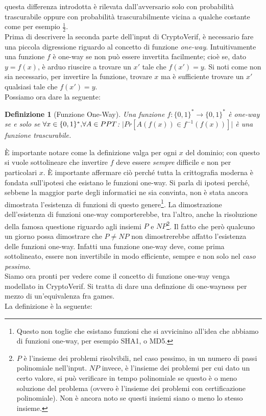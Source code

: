 \documentclass[a4paper,openright,twoside,12pt]{report}
\newtheorem{definizione}{Definizione}[chapter]
\begin{document}
questa differenza introdotta \`e rilevata dall'avversario solo con probabilit\`a trascurabile oppure con probabilit\`a trascurabilmente vicina a qualche costante come 
per esempio $\frac{1}{2}$.
\\ 
Prima di descrivere la seconda parte dell'input di CryptoVerif, \`e necessario fare una piccola digressione riguardo al concetto di funzione \emph{one-way}.
Intuitivamente una funzione $f$ \`e one-way se non pu\`o essere invertita facilmente; cio\`e se, dato $y=f(x)$, \`e arduo riuscire a trovare un $x'$ tale che $f(x')=y$. 
Si noti come non sia necessario, per invertire la funzione, trovare $x$ ma \`e sufficiente trovare un $x'$ qualsiasi tale che $f(x')=y$.
\\Possiamo ora dare la seguente:
\begin{definizione}[Funzione One-Way]
Una funzione $f: \{0,1\}^*\rightarrow \{0,1\}^*$ \`e one-way se e solo se $\forall x \in  \{0,1\}^* \hbox{,} \forall A \in PPT$:  $\lvert Pr[A(f(x)) \in f^{-1}(f(x))]\rvert$ \`e una funzione 
trascurabile.
\end{definizione}

\`E importante notare come la definizione valga per ogni $x$ del dominio; con questo si vuole sottolineare che invertire $f$ deve essere \emph{sempre} difficile e non per particolari $x$.
\`E importante affermare ci\`o perch\'e tutta la crittografia moderna \`e fondata sull'ipotesi che esistano le funzioni one-way.
Si parla di ipotesi perch\'e, sebbene la maggior parte degli informatici ne sia convinta, non \`e stata ancora dimostrata l'esistenza di funzioni di questo genere\footnote{Questo non toglie
che esistano funzioni che si avvicinino all'idea che abbiamo di funzioni one-way, per esempio SHA1, o MD5.}.
La dimostrazione dell'esistenza di funzioni one-way comporterebbe, tra l'altro, anche la risoluzione della famosa questione riguardo agli insiemi
$P$ e $NP$\footnote{$P$ \`e l'insieme dei problemi risolvibili, nel caso pessimo, in un numero di passi polinomiale nell'input. $NP$ invece, \`e l'insieme dei problemi per cui dato un certo valore, 
si pu\`o verificare in tempo polinomiale se questo \`e o meno soluzione del problema (ovvero \`e l'insieme dei problemi con certificazione polinomiale). 
Non \`e ancora noto se questi insiemi siano o meno lo stesso insieme.}.
Il fatto che però qualcuno un giorno possa dimostrare che $P \neq NP$ non dimostrerebbe affatto l'esistenza delle funzioni one-way. 
Infatti una funzione one-way deve, come prima sottolineato, essere non invertibile in modo efficiente, sempre e non solo nel \emph{caso pessimo}. \\ 
Siamo ora pronti per vedere come il concetto di funzione one-way venga modellato in CryptoVerif.
Si tratta di dare una definzione di one-wayness per mezzo di un'equivalenza fra games.\\La definizione \`e la seguente:
\end{document}
